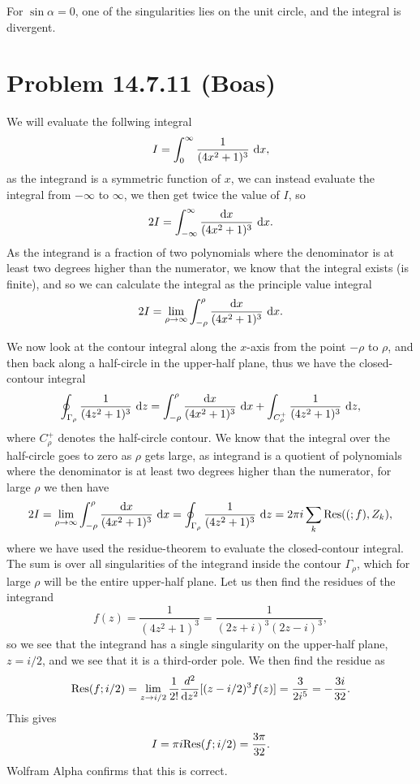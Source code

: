 \documentclass[a4paper, 11pt, titlepage, english]{article}
\renewcommand{\d}{{\rm d}}
\newcommand{\Res}[2]{{\rm Res}(#1;#2)}
\begin{document}
For $\sin\alpha=0$, one of the singularities lies on the unit circle, and the integral is divergent.



\clearpage
\section*{Problem 14.7.11 (Boas)}
We will evaluate the follwing integral
$$I = \int_0^{\infty} \frac{1}{(4x^2 +1)^3} {\rm\ d}x,$$
as the integrand is a symmetric function of $x$, we can instead evaluate the integral from $-\infty$ to $\infty$, we then get twice the value of $I$, so
$$2I = \int_{-\infty}^\infty \frac{\d x}{(4x^2 +1)^3} {\rm\ d}x.$$
As the integrand is a fraction of two polynomials where the denominator is at least two degrees higher than the numerator, we know that the integral exists (is finite), and so we can calculate the integral as the principle value integral
$$2I = \lim_{\rho \to \infty} \int_{-\rho}^\rho \frac{\d x}{(4x^2 +1)^3} {\rm\ d}x.$$

We now look at the contour integral along the $x$-axis from the point $-\rho$ to $\rho$, and then back along a half-circle in the upper-half plane, thus we have the closed-contour integral
$$\oint_{\Gamma_\rho} \frac{1}{(4z^2+1)^3}\ \d z = \int_{-\rho}^\rho\frac{\d x}{(4x^2 +1)^3} {\rm\ d}x + \int_{C_\rho^+} \frac{1}{(4z^2+1)^3}\ \d z,$$
where ${C_\rho^+}$ denotes the half-circle contour. We know that the integral over the half-circle goes to zero as $\rho$ gets large, as integrand is a quotient of polynomials where the denominator is at least two degrees higher than the numerator, for large $\rho$ we then have
$$2I = \lim_{\rho \to \infty} \int_{-\rho}^\rho \frac{\d x}{(4x^2 +1)^3} {\rm\ d}x = \oint_{\Gamma_\rho} \frac{1}{(4z^2+1)^3}\ \d z = 2\pi i\sum_k \Res(f,Z_k),$$
where we have used the residue-theorem to evaluate the closed-contour integral. The sum is over all singularities of the integrand inside the contour $\Gamma_{\rho}$, which for large $\rho$ will be the entire upper-half plane. Let us then find the residues of the integrand
$$f(z) = \frac{1}{(4z^2+1)^3} = \frac{1}{(2z+i)^3(2z-i)^3},$$
so we see that the integrand has a single singularity on the upper-half plane, $z=i/2$, and we see that it is a third-order pole. We then find the residue as
$$\Res{f}{i/2} = \lim_{z\to i/2} \frac{1}{2!}\frac{d^2}{\d z^2}[(z-i/2)^3 f(z)] = \frac{3}{2i^5} = -\frac{3i}{32}.$$
This gives
$$I = \pi i \Res{f}{i/2} = \frac{3\pi}{32}.$$
Wolfram Alpha confirms that this is correct.
\end{document}
